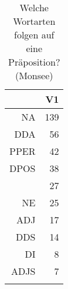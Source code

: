 \begin{table}[ht]
\centering
\begin{tabular}{rr}
  \lsptoprule
 & V1 \\ 
  \midrule
NA & 139 \\ 
  DDA &  56 \\ 
  PPER &  42 \\ 
  DPOS &  38 \\ 
   &  27 \\ 
  NE &  25 \\ 
  ADJ &  17 \\ 
  DDS &  14 \\ 
  DI &   8 \\ 
  ADJS &   7 \\ 
   \lspbottomrule
\end{tabular}
\caption{Welche Wortarten folgen auf eine Präposition?  (Monsee)} 
\end{table}
